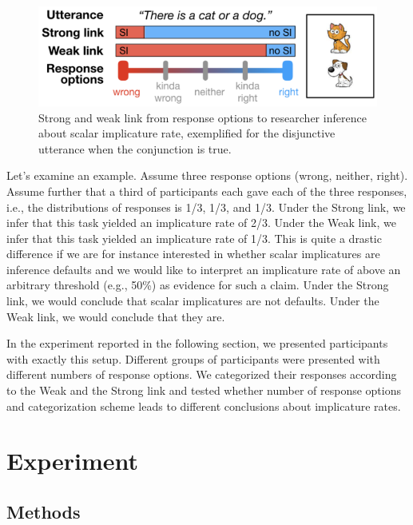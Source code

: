 \documentclass[floatsintext,man]{apa6}
\theoremstyle{definition}
\theoremstyle{definition}
\theoremstyle{definition}
\theoremstyle{remark}
\begin{document}
\begin{figure}

{\centering \includegraphics{writeup_files/figure-latex/linkvisualization-1} 

}

\caption{Strong and weak link from response options to researcher inference about scalar implicature rate, exemplified for the disjunctive utterance when the conjunction is true.}\label{fig:linkvisualization}
\end{figure}

Let's examine an example. Assume three response options (wrong, neither,
right). Assume further that a third of participants each gave each of
the three responses, i.e., the distributions of responses is 1/3, 1/3,
and 1/3. Under the Strong link, we infer that this task yielded an
implicature rate of 2/3. Under the Weak link, we infer that this task
yielded an implicature rate of 1/3. This is quite a drastic difference
if we are for instance interested in whether scalar implicatures are
inference defaults and we would like to interpret an implicature rate of
above an arbitrary threshold (e.g., 50\%) as evidence for such a claim.
Under the Strong link, we would conclude that scalar implicatures are
not defaults. Under the Weak link, we would conclude that they are.

In the experiment reported in the following section, we presented
participants with exactly this setup. Different groups of participants
were presented with different numbers of response options. We
categorized their responses according to the Weak and the Strong link
and tested whether number of response options and categorization scheme
leads to different conclusions about implicature rates.

\section{Experiment}\label{experiment}

\subsection{Methods}\label{methods}
\end{document}
